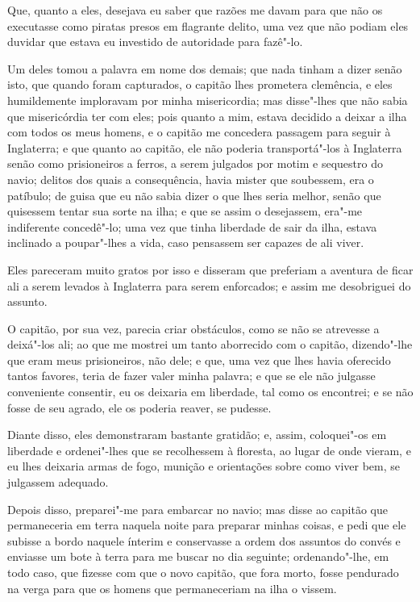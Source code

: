 Que, quanto a eles, desejava eu saber que razões me davam para que não
os executasse como piratas presos em flagrante delito, uma vez que não
podiam eles duvidar que estava eu investido de autoridade para fazê"-lo.

Um deles tomou a palavra em nome dos demais; que nada tinham a dizer
senão isto, que quando foram capturados, o capitão lhes prometera
clemência, e eles humildemente imploravam por minha misericordia; mas
disse"-lhes que não sabia que misericórdia ter com eles; pois quanto a
mim, estava decidido a deixar a ilha com todos os meus homens, e o
capitão me concedera passagem para seguir à Inglaterra; e que quanto ao
capitão, ele não poderia transportá"-los à Inglaterra senão como
prisioneiros a ferros, a serem julgados por motim e sequestro do navio;
delitos dos quais a consequência, havia mister que soubessem, era o
patíbulo; de guisa que eu não sabia dizer o que lhes seria melhor, senão
que quisessem tentar sua sorte na ilha; e que se assim o desejassem,
era"-me indiferente concedê"-lo; uma vez que tinha liberdade de sair da
ilha, estava inclinado a poupar"-lhes a vida, caso pensassem ser capazes
de ali viver.

Eles pareceram muito gratos por isso e disseram que preferiam a aventura
de ficar ali a serem levados à Inglaterra para serem enforcados; e assim
me desobriguei do assunto.

O capitão, por sua vez, parecia criar obstáculos, como se não se
atrevesse a deixá"-los ali; ao que me mostrei um tanto aborrecido com o
capitão, dizendo"-lhe que eram meus prisioneiros, não dele; e que, uma
vez que lhes havia oferecido tantos favores, teria de fazer valer minha
palavra; e que se ele não julgasse conveniente consentir, eu os deixaria
em liberdade, tal como os encontrei; e se não fosse de seu agrado, ele
os poderia reaver, se pudesse.

Diante disso, eles demonstraram bastante gratidão; e, assim, coloquei"-os
em liberdade e ordenei"-lhes que se recolhessem à floresta, ao lugar de
onde vieram, e eu lhes deixaria armas de fogo, munição e orientações
sobre como viver bem, se julgassem adequado.

Depois disso, preparei"-me para embarcar no navio; mas disse ao capitão
que permaneceria em terra naquela noite para preparar minhas coisas, e
pedi que ele subisse a bordo naquele ínterim e conservasse a ordem dos
assuntos do convés e enviasse um bote à terra para me buscar no dia
seguinte; ordenando"-lhe, em todo caso, que fizesse com que o novo
capitão, que fora morto, fosse pendurado na verga para que os homens que
permaneceriam na ilha o vissem.

